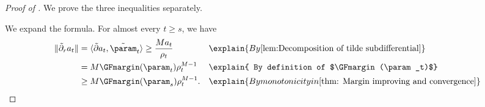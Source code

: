 \begin{proof}[Proof of ]
We prove the three inequalities separately. 

  We  expand the formula. For almost every  $t\ge s$, we have
\begin{align*}
\| \tilde  \partial_r a_t\| & = \langle \tilde  \partial a_t, \tilde{\param}_t \rangle \ge \frac{M a_t}{\rho_t} &&\explain{ By \Cref{lem:Decomposition of tilde subdifferential} } \\ 
& = M \GFmargin(\param_t) \rho_t^{M-1} &&\explain{ By definition of $\GFmargin(\param_t)$}\\ 
& \ge M \GFmargin(\param_s) \rho_t^{M-1}. &&\explain{ By monotonicity  in \Cref{thm: Margin improving and convergence}}  
\end{align*}


\end{proof}
